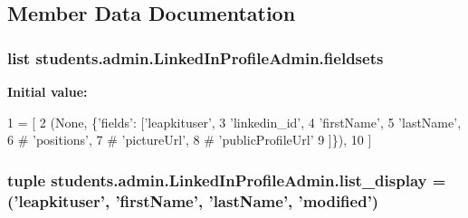 \subsection{Member Data Documentation}
\hypertarget{classstudents_1_1admin_1_1_linked_in_profile_admin_a49860d8113b436c82419cdb40f94cf7e}{
\subsubsection[{fieldsets}]{\setlength{\rightskip}{0pt plus 5cm}list students.\-admin.\-Linked\-In\-Profile\-Admin.\-fieldsets\hspace{0.3cm}{\ttfamily [static]}}}\label{classstudents_1_1admin_1_1_linked_in_profile_admin_a49860d8113b436c82419cdb40f94cf7e}
{\bfseries Initial value\-:}
\begin{DoxyCode}
1 = [
2         (\textcolor{keywordtype}{None}, \{\textcolor{stringliteral}{'fields'}: [\textcolor{stringliteral}{'leapkituser'},
3                            \textcolor{stringliteral}{'linkedin\_id'},
4                            \textcolor{stringliteral}{'firstName'},
5                            \textcolor{stringliteral}{'lastName'},
6 \textcolor{comment}{#                          'positions',}
7 \textcolor{comment}{#                          'pictureUrl',}
8 \textcolor{comment}{#                          'publicProfileUrl'}
9                            ]\}),
10     ]
\end{DoxyCode}
\hypertarget{classstudents_1_1admin_1_1_linked_in_profile_admin_ae5480d47cffc8596e57f5a3fa03dc0bb}{
\subsubsection[{list\-\_\-display}]{\setlength{\rightskip}{0pt plus 5cm}tuple students.\-admin.\-Linked\-In\-Profile\-Admin.\-list\-\_\-display = ('leapkituser', 'first\-Name', 'last\-Name', 'modified')\hspace{0.3cm}{\ttfamily [static]}}}\label{classstudents_1_1admin_1_1_linked_in_profile_admin_ae5480d47cffc8596e57f5a3fa03dc0bb}
